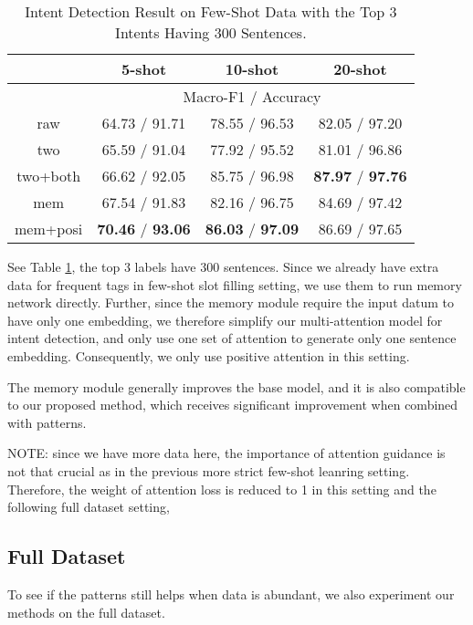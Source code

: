 \begin{table}
\setlength{\tabcolsep}{0.23em}
\centering
\small{
\begin{tabular}{|c|c|c|c|}

\hline
  & \multicolumn{1}{|c|}{5-shot} & \multicolumn{1}{|c|}{10-shot} & \multicolumn{1}{|c|}{20-shot}  \\
 \hline
  & \multicolumn{3}{|c|}{Macro-F1 / Accuracy}   \\
\hline
raw & 64.73 / 91.71 & 78.55 / 96.53 & 82.05 / 97.20 \\
\hline
two & 65.59 / 91.04 & 77.92 / 95.52 & 81.01 / 96.86 \\
\hline
two+both & 66.62 / 92.05 & 85.75 / 96.98 & \textbf{87.97} / \textbf{97.76} \\
\hline
mem & 67.54 / 91.83 & 82.16 / 96.75 & 84.69 / 97.42 \\
\hline
mem+posi & \textbf{70.46} / \textbf{93.06} & \textbf{86.03} / \textbf{97.09} & 86.69 / 97.65 \\
\hline

\end{tabular}
}
\caption{Intent Detection Result on Few-Shot Data with the Top 3 Intents Having 300 Sentences.}
\label{tab_intent_few_fill}
\end{table}

See Table \ref{tab_intent_few_fill}, the top 3 labels have 300 sentences. Since we already have extra data for frequent tags in few-shot slot filling setting, we use them to run memory network directly. Further, since the memory module require the input datum to have only one embedding, we therefore simplify our multi-attention model for intent detection, and only use one set of attention to generate only one sentence embedding. Consequently, we only use positive attention in this setting.

The memory module generally improves the base model, and it is also compatible to our proposed method, which receives significant improvement when combined with \RE patterns.

NOTE: since we have more data here, the importance of attention guidance is not that crucial as in the previous more strict few-shot leanring setting. Therefore, the weight of attention loss is reduced to 1 in this setting and the following full dataset setting, 


\subsection{Full Dataset}
To see if the \RE patterns still helps when data is abundant, we also experiment our methods on the full dataset.

